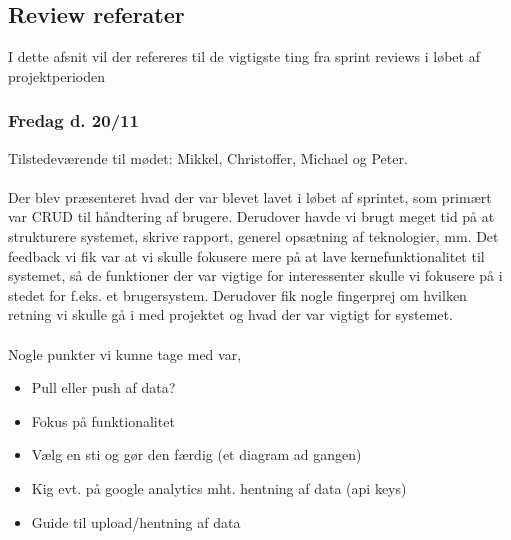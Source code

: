 \subsection{Review referater}
I dette afsnit vil der refereres til de vigtigste ting fra sprint reviews i løbet af projektperioden
\subsubsection{Fredag d. 20/11}
Tilstedeværende til mødet: Mikkel, Christoffer, Michael og Peter.
\\\\
Der blev præsenteret hvad der var blevet lavet i løbet af sprintet, som primært var CRUD til håndtering af brugere. Derudover havde vi brugt meget tid på at strukturere systemet, skrive rapport, generel opsætning af teknologier, mm.
Det feedback vi fik var at vi skulle fokusere mere på at lave kernefunktionalitet til systemet, så de funktioner der var vigtige for interessenter skulle vi fokusere på i stedet for f.eks. et brugersystem.
Derudover fik nogle fingerprej om hvilken retning vi skulle gå i med projektet og hvad der var vigtigt for systemet.
\\\\
Nogle punkter vi kunne tage med var,
\begin{itemize}
    \item{Pull eller push af data?}
    \item{Fokus på funktionalitet}
    \item{Vælg en sti og gør den færdig (et diagram ad gangen)}
    \item{Kig evt. på google analytics mht. hentning af data (api keys)}
    \item{Guide til upload/hentning af data}
\end{itemize}
